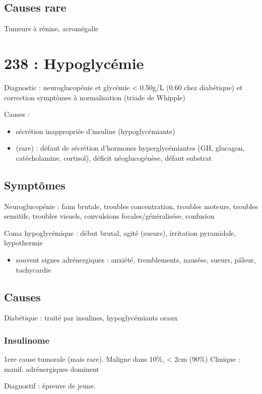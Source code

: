 \documentclass[11pt]{article}
\begin{document}
\subsection{Causes rare}
\label{sec:org9c0910b}
Tumeurs à rénine, acromégalie
\section{238 : Hypoglycémie}
\label{sec:org0f0b6d7}
Diagnostic : neuroglucopénie et glycémie < 0.50g/L (0.60 chez diabétique) et correction symptômes
à normalisation (triade de Whipple)

Causes :
\begin{itemize}
\item sécrétion inappropriée d'insuline (hypoglycémiante)
\item (rare) : défaut de sécrétion d'hormones hyperglycémiantes (GH, glucagon,
catécholamine, cortisol), déficit néoglucogénèse, défaut substrat
\end{itemize}

\subsection{Symptômes}
\label{sec:org60812f2}
Neuroglucopénie : faim brutale, troubles concentration, troubles moteurs,
troubles sensitifs, troubles visuels, convulsions focales/généralisése,
confusion

Coma hypoglycémique : début brutal, agité (sueurs), irritation pyramidale, hypothermie

\begin{itemize}
\item souvent signes adrénergiques : anxiété, tremblements, nausése, sueurs,
pâleur, tachycardie
\end{itemize}

\subsection{Causes}
\label{sec:orgbd835a5}
Diabétique : traité par insulines, hypoglycémiants oraux

\subsubsection{Insulinome}
\label{sec:org89531fd}
1ere cause tumorale (mais rare). Maligne dans 10\%, < 2cm (90\%)
Clinique : manif. adrénergiques dominent

Diagnostif : épreuve de jeune. 
\end{document}
